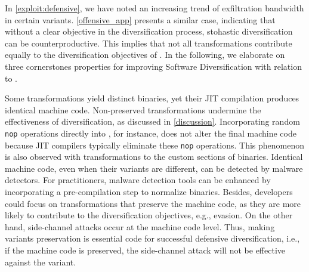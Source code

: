 \label{exploit:discussion}
In \autoref{exploit:defensive}, we have noted an increasing trend of exfiltration bandwidth in certain variants. 
\autoref{offensive_app} presents a similar case, indicating that without a clear objective in the diversification process, stohastic diversification can be counterproductive. 
This implies that not all transformations contribute equally to the diversification objectives of \Wasm.
In the following, we elaborate on three cornerstones properties for improving Software Diversification with relation to \Wasm.


\begin{strategy}[Preservation]    
    Some transformations yield distinct \Wasm binaries, yet their JIT compilation produces identical machine code.
    Non-preserved transformations undermine the effectiveness of diversification, as discussed in \autoref{discussion}.
    Incorporating random \texttt{nop} operations directly into \Wasm, for instance, does not alter the final machine code because JIT compilers typically eliminate these \texttt{nop} operations.
    This phenomenon is also observed with transformations to the custom sections of \Wasm binaries.
    Identical machine code, even when their \Wasm variants are different, can be detected by malware detectors.
    For practitioners, malware detection tools can be enhanced by incorporating a pre-compilation step to normalize \Wasm binaries.
    Besides, developers could focus on transformations that preserve the machine code, as they are more likely to contribute to the diversification objectives, e.g., evasion.
    On the other hand, side-channel attacks occur at the machine code level.
    Thus, making \Wasm variants preservation is essential code for successful defensive diversification, i.e., if the machine code is preserved, the side-channel attack will not be effective against the \Wasm variant.    
\end{strategy}



 
